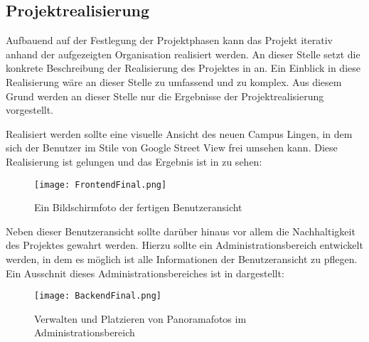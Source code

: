 \subsection{Projektrealisierung}
\label{sec:Projektrealisierung}

Aufbauend auf der Festlegung der Projektphasen kann das Projekt iterativ anhand der aufgezeigten Organisation
realisiert werden. An dieser Stelle setzt die konkrete Beschreibung der Realisierung des
Projektes in \citet{modelierungUndBetrieb2014} an.
Ein Einblick in diese Realisierung wäre an dieser Stelle zu umfassend und zu komplex. Aus diesem Grund werden an dieser
Stelle nur die Ergebnisse der Projektrealisierung vorgestellt.

Realisiert werden sollte eine visuelle Ansicht des neuen Campus Lingen, in dem sich der Benutzer im Stile von Google
Street View frei umsehen kann. Diese Realisierung ist gelungen und das Ergebnis ist in 
zu sehen:

\clearpage
\begin{figure}[htb] 
\centering
\texttt{[image: FrontendFinal.png]}
\caption[Abbildung der Benutzeransicht]{Ein Bildschirmfoto der fertigen Benutzeransicht\protect}
\label{fig:FrontendFinal}
\end{figure}

Neben dieser Benutzeransicht sollte darüber hinaus vor allem die Nachhaltigkeit des Projektes gewahrt werden.
Hierzu sollte ein Administrationsbereich entwickelt werden, in dem es möglich ist alle Informationen
der Benutzeransicht zu pflegen. Ein Ausschnit dieses Administrationsbereiches ist 
in  dargestellt:

\begin{figure}[htb] 
\centering
\texttt{[image: BackendFinal.png]}
\caption[Ausschnitt des Administrationsbereiches]{Verwalten und Platzieren von Panoramafotos im Administrationsbereich\protect}
\label{fig:BackendFinal}
\end{figure}
\clearpage